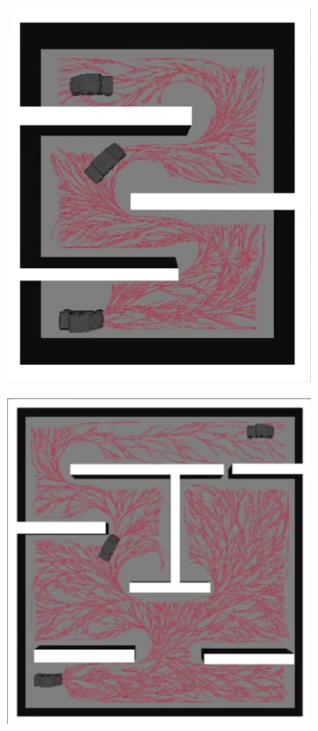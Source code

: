 \documentclass[../thesis.tex]{subfiles}
\begin{document}
\begin{figure}[t]
	\centering
	\begin{subfigure}[b]{0.3\linewidth}
		\includegraphics[width=\columnwidth]{./RRTPlanner/fig/rrt-sim-maze1.png}
		\subcaption{}
		\label{fig:rrt-sim-maze1}
	\end{subfigure}
	\begin{subfigure}[b]{0.3\linewidth}
		\includegraphics[width=\columnwidth]{./RRTPlanner/fig/rrt-sim-maze2.png}

\end{subfigure}
\end{figure}
\end{document}
